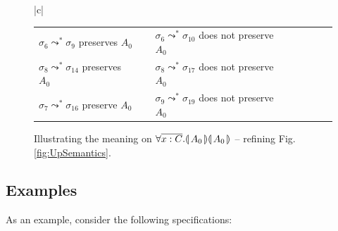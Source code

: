 {
 
 \begin{figure}[htb]
\begin{tabular}{|c|}
\hline  %
\\
\hline
\begin{tabular}{lclclcl} 
$ {\sigma_6} \leadsto^*  \sigma_9 $ preserves $A_0$ & &
$ {\sigma_6} \leadsto^*  \sigma_{10} $ does not preserve $A_0$ \\
$ {\sigma_8} \leadsto^*  \sigma_{14} $ preserves $A_0$ & &
$ {\sigma_8} \leadsto^* \sigma_{17} $ does not preserve $A_0$\\
$ {\sigma_7} \leadsto^*  \sigma_{16} $  preserve $A_0$ & &
$ {\sigma_9} \leadsto^*  \sigma_{19} $ does not preserve $A_0$
\\
\hline
\end{tabular}
\end{tabular}
   \caption{Illustrating  the meaning on ${\forall {\overline {x:C}}.{\llparenthesis}\, A_0 \,{\rrparenthesis}{\llparenthesis}\, A_0 \,{\rrparenthesis}}$  -- refining Fig. \ref{fig:UpSemantics}.  }
   \label{fig:illusrPreserve} 
 \end{figure}
 
\subsection{\SpecLang Examples}
\noindent
As an example, consider the following    specifications:

}
